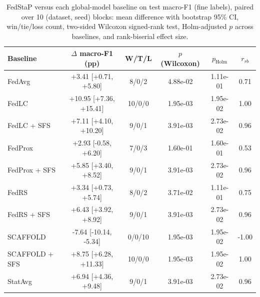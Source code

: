 \begin{table}[t]
\centering
\caption{FedStaP versus each global-model baseline on test macro-F1 (fine labels), paired over 10 (dataset, seed) blocks: mean difference with bootstrap 95\% CI, win/tie/loss count, two-sided Wilcoxon signed-rank test, Holm-adjusted $p$ across baselines, and rank-biserial effect size.}
\label{tab:stats_fine}
\small
\begin{tabular}{lccccc}
\toprule
Baseline & $\Delta$ macro-F1 (pp) & W/T/L & $p$ (Wilcoxon) & $p_{\text{Holm}}$ & $r_{rb}$ \\
\midrule
FedAvg & +3.41 [+0.71, +5.80] & 8/0/2 & 4.88e-02 & 1.11e-01 & 0.71 \\
FedLC & +10.95 [+7.36, +15.41] & 10/0/0 & 1.95e-03 & 1.95e-02 & 1.00 \\
FedLC + SFS & +7.11 [+4.10, +10.20] & 9/0/1 & 3.91e-03 & 2.73e-02 & 0.96 \\
FedProx & +2.93 [-0.58, +6.20] & 7/0/3 & 1.60e-01 & 1.60e-01 & 0.53 \\
FedProx + SFS & +5.85 [+3.40, +8.52] & 9/0/1 & 3.91e-03 & 2.73e-02 & 0.96 \\
FedRS & +3.34 [+0.73, +5.74] & 8/0/2 & 3.71e-02 & 1.11e-01 & 0.75 \\
FedRS + SFS & +6.43 [+3.92, +8.92] & 9/0/1 & 3.91e-03 & 2.73e-02 & 0.96 \\
SCAFFOLD & -7.64 [-10.14, -5.34] & 0/0/10 & 1.95e-03 & 1.95e-02 & -1.00 \\
SCAFFOLD + SFS & +8.75 [+6.28, +11.33] & 10/0/0 & 1.95e-03 & 1.95e-02 & 1.00 \\
StatAvg & +6.94 [+4.36, +9.48] & 9/0/1 & 3.91e-03 & 2.73e-02 & 0.96 \\
\bottomrule
\end{tabular}
\end{table}
